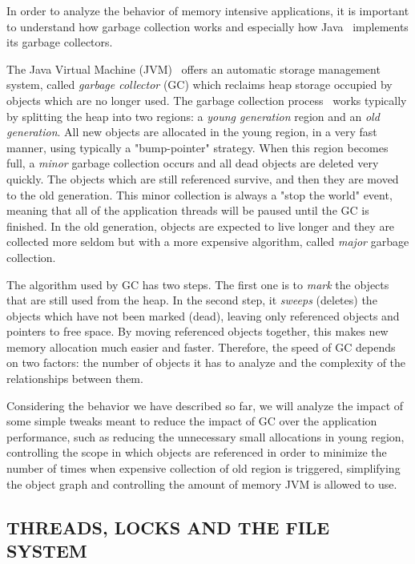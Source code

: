 \documentclass[a4paper,twoside]{article}
\begin{document}
In order to analyze the behavior of memory intensive applications, it is important to understand how garbage collection
works and especially how Java~\cite{java} implements its garbage collectors.

The Java Virtual Machine (JVM)~\cite{lindholm:2014} offers an automatic storage management system,
called {\textit{garbage collector} (GC)} which reclaims heap storage occupied by objects which are no longer used.
The garbage collection process~\cite{gc:oracle} works typically by splitting the heap into two regions:
a {\textit{young generation}} region and an {\textit{old generation}}.
All new objects are allocated in the young region, in a very fast manner, using typically a "bump-pointer" strategy.
When this region becomes full,  a {\textit{minor}} garbage collection occurs and all dead objects are deleted very quickly.
The objects which are still referenced survive, and then they are moved to the old generation.
This minor collection is always a "stop the world" event, meaning that all of the application threads will be paused
until the GC is finished.
In the old generation, objects are expected to live longer and they are collected more seldom but with a more expensive
algorithm, called {\textit{major}} garbage collection.

The algorithm used by GC has two steps.
The first one is to {\textit{mark}} the objects that are still used from the heap.
In the second step, it {\textit{sweeps}  (deletes)} the objects which have not been marked (dead), leaving only
referenced objects and pointers to free space.
By moving referenced objects together, this makes new memory allocation much easier and faster.
Therefore, the speed of GC depends on two factors: the number of objects it has to analyze and the complexity of the
relationships between them.

Considering the behavior we have described so far, we will analyze the impact of some simple tweaks
meant to reduce the impact of GC over the application performance, such as
reducing the unnecessary small allocations in young region, controlling the scope in which objects are referenced in
order to minimize the number of times when expensive collection of old region is triggered,
simplifying the object graph and controlling the amount of memory JVM is allowed to use.




\subsection{\uppercase{Threads, Locks and the File System}}
\label{background:threads}
\end{document}
